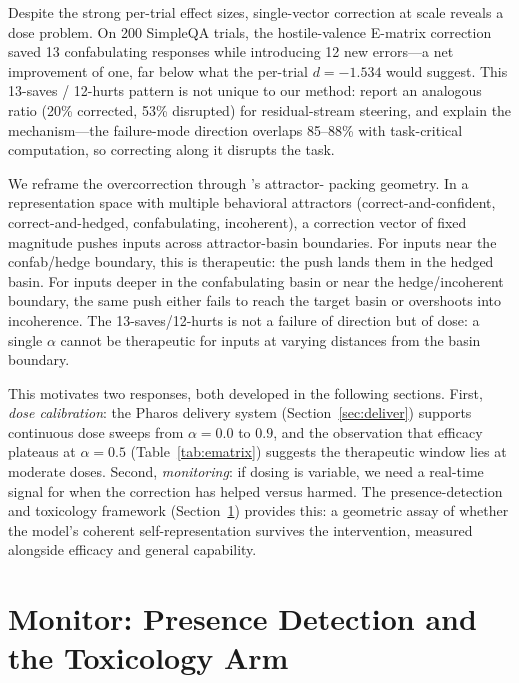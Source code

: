 \documentclass[11pt,a4paper]{article}
\begin{document}
Despite the strong per-trial effect sizes, single-vector correction at scale
reveals a dose problem. On 200 SimpleQA trials, the hostile-valence E-matrix
correction saved 13 confabulating responses while introducing 12 new errors---a
net improvement of one, far below what the per-trial $d{=}{-}1.534$ would
suggest. This 13-saves / 12-hurts pattern is not unique to our method:
\citet{basu2026interpretability} report an analogous ratio (20\% corrected,
53\% disrupted) for residual-stream steering, and
\citet{liu2026decodable} explain the mechanism---the failure-mode direction
overlaps 85--88\% with task-critical computation, so correcting along it
disrupts the task.

We reframe the overcorrection through \citet{vastola2025packing}'s attractor-
packing geometry. In a representation space with multiple behavioral attractors
(correct-and-confident, correct-and-hedged, confabulating, incoherent), a
correction vector of fixed magnitude pushes inputs across attractor-basin
boundaries. For inputs near the confab/hedge boundary, this is therapeutic: the
push lands them in the hedged basin. For inputs deeper in the confabulating basin
or near the hedge/incoherent boundary, the same push either fails to reach the
target basin or overshoots into incoherence. The 13-saves/12-hurts is not a
failure of direction but of dose: a single $\alpha$ cannot be therapeutic for
inputs at varying distances from the basin boundary.

This motivates two responses, both developed in the following sections. First,
\emph{dose calibration}: the Pharos delivery system
(Section~\ref{sec:deliver}) supports continuous dose sweeps from $\alpha{=}0.0$
to $0.9$, and the observation that efficacy plateaus at $\alpha{=}0.5$
(Table~\ref{tab:ematrix}) suggests the therapeutic window lies at moderate
doses. Second, \emph{monitoring}: if dosing is variable, we need a real-time
signal for when the correction has helped versus harmed. The presence-detection
and toxicology framework (Section~\ref{sec:monitor}) provides this: a geometric
assay of whether the model's coherent self-representation survives the
intervention, measured alongside efficacy and general capability.

\section{Monitor: Presence Detection and the Toxicology Arm}
\label{sec:monitor}
\end{document}
